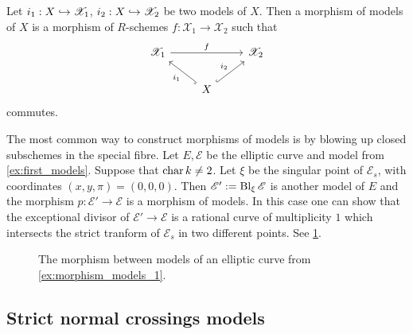 \begin{definition}
	Let $i_1: X \hookrightarrow \mathscr X_1$, $i_2: X \hookrightarrow \mathscr X_2$ be two models of $X$. 
	Then a morphism of models of $X$ is a morphism of $R$-schemes $f: \mathscr X_1 \to \mathscr X_2$ such that \[
	\begin{tikzcd}
		\mathscr X_1 \ar{rr}{f} & & \mathscr X_2 \\
					& X \ar[hookrightarrow]{ul}{i_1}  \ar[hookrightarrow]{ur}{i_2}
	\end{tikzcd}
	\] 
	commutes.
\end{definition}

\begin{example}\label{ex:morphism_models_1}
	The most common way to construct morphisms of models is by blowing up closed subschemes in the special fibre. 
	Let $E, \mathscr E$ be the elliptic curve and model from \cref{ex:first_models}. 
	Suppose that $\operatorname{char} k \ne 2$. 
	Let $\xi$ be the singular point of $\mathscr E _s$, with coordinates $(x, y,\pi) = (0,0,0)$. 
	Then  $\mathscr E' := \operatorname{Bl}_\xi \mathscr E $ is another model of $E$ and the morphism $p:\mathscr E' \to \mathscr E $ is a morphism of models. 
	In this case one can show that the exceptional divisor of $\mathscr E' \to \mathscr E$ is a rational curve of multiplicity $1$ which intersects the strict tranform of $\mathscr E _s$ in two different points. 
	See \cref{fig:morphism_models_blowup_1}.
\end{example}

\begin{figure}[h]
    \centering
    \caption{The morphism between models of an elliptic curve from \cref{ex:morphism_models_1}.}
    \label{fig:morphism_models_blowup_1}
\end{figure}



\subsection{Strict normal crossings models} \label{sec:strict_normal_crossings_models}


